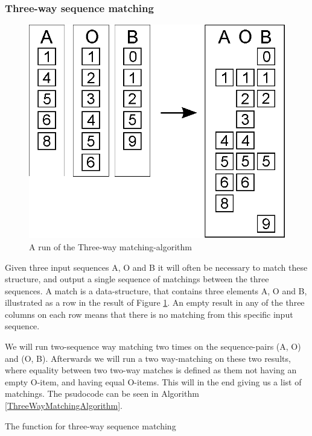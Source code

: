 \documentclass[11pt]{article}
\begin{document}
\subsubsection{Three-way sequence matching}
\begin{figure}
   \centerline{\includegraphics[scale=0.4]{drawings/eps/threewaymatching.eps}}
   \caption{A run of the Three-way matching-algorithm}
   \label{ThreewayMatching}
\end{figure}

Given three input sequences A, O and B it will often be necessary to match these structure, and output a single sequence of matchings between the three sequences. A match is a data-structure, that contains three elements A, O and B, illustrated as a row in the result of Figure \ref{ThreewayMatching}. An empty result in any of the three columns on each row means that there is no matching from this specific input sequence.

We will run two-sequence way matching two times on the sequence-pairs (A, O) and (O, B). Afterwards we will run a two way-matching on these two results, where equality between two two-way matches is defined as them not having an empty O-item, and having equal O-items. This will in the end giving us a list of matchings. The psudocode can be seen in Algorithm \ref{ThreeWayMatchingAlgorithm}.



\begin{algorithm}
\caption{The function for three-way sequence matching}
  \label{ThreeWayMatchingAlgorithm}
\end{algorithm}
\end{document}
